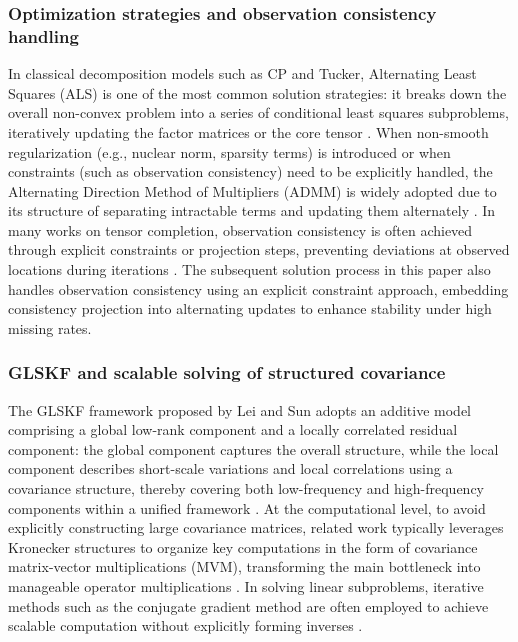 \documentclass[a4paper,12pt]{article}
\numberwithin{equation}{section}
\numberwithin{algorithm}{section}
\theoremstyle{remark}
\theoremstyle{definition}
\begin{document}
\subsubsection{Optimization strategies and observation consistency handling}
In classical decomposition models such as CP and Tucker, Alternating Least Squares (ALS) is one of the most common solution strategies: it breaks down the overall non-convex problem into a series of conditional least squares subproblems, iteratively updating the factor matrices or the core tensor \cite{kolda2009tensor}. When non-smooth regularization (e.g., nuclear norm, sparsity terms) is introduced or when constraints (such as observation consistency) need to be explicitly handled, the Alternating Direction Method of Multipliers (ADMM) is widely adopted due to its structure of separating intractable terms and updating them alternately \cite{boyd2011admm}. In many works on  tensor completion, observation consistency is often achieved through explicit constraints or projection steps, preventing deviations at observed locations during iterations \cite{zhang2017tsvd}. 
The subsequent solution process in this paper also handles observation consistency using an explicit constraint approach, embedding consistency projection into alternating updates to enhance stability under high missing rates.






\subsubsection{GLSKF and scalable solving of structured covariance}

The GLSKF framework proposed by Lei and Sun adopts an additive model comprising a global low-rank component and a locally correlated residual component: the global component captures the overall structure, while the local component describes short-scale variations and local correlations using a covariance structure, thereby covering both low-frequency and high-frequency components within a unified framework \cite{lei2024glskf}. At the computational level, to avoid explicitly constructing large covariance matrices, related work typically leverages Kronecker structures to organize key computations in the form of covariance matrix-vector multiplications (MVM), transforming the main bottleneck into manageable operator multiplications \cite{allen2014glsmd}. In solving linear subproblems, iterative methods such as the conjugate gradient method are often employed to achieve scalable computation without explicitly forming inverses \cite{hestenes1952cg}.
\end{document}
